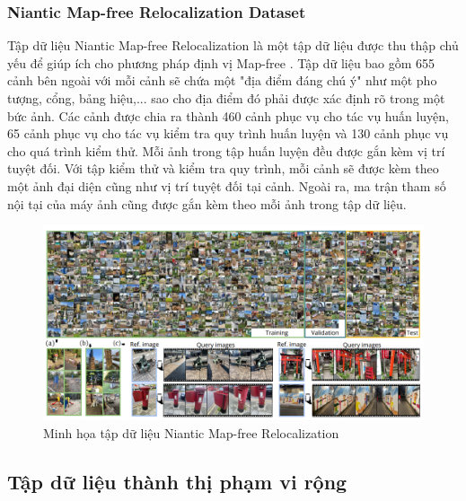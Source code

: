 \subsubsection*{Niantic Map-free Relocalization Dataset}
Tập dữ liệu Niantic Map-free Relocalization \cite{arnold2022mapfree} là một tập dữ liệu được thu thập chủ yếu để giúp ích cho phương pháp định vị Map-free \cite{arnold2022mapfree}. Tập dữ liệu bao gồm 655 cảnh bên ngoài với mỗi cảnh sẽ chứa một "địa điểm đáng chú ý" như một pho tượng, cổng, bảng hiệu,... sao cho địa điểm đó phải được xác định rõ trong một bức ảnh. Các cảnh được chia ra thành 460 cảnh phục vụ cho tác vụ huấn luyện, 65 cảnh phục vụ cho tác vụ kiểm tra quy trình huấn luyện và 130 cảnh phục vụ cho quá trình kiểm thử. Mỗi ảnh trong tập huấn luyện đều được gắn kèm vị trí tuyệt đối. Với tập kiểm thử và kiểm tra quy trình, mỗi cảnh sẽ được kèm theo một ảnh đại diện cũng như vị trí tuyệt đối tại cảnh. Ngoài ra, ma trận tham số nội tại của máy ảnh cũng được gắn kèm theo mỗi ảnh trong tập dữ liệu.
\begin{figure}[H]
	\centering
	\includegraphics[width=\textwidth]{pics/Chapter2/niantic.png}
	\caption{Minh họa tập dữ liệu Niantic Map-free Relocalization \cite{arnold2022mapfree}}
\end{figure}
\subsection{Tập dữ liệu thành thị phạm vi rộng}
